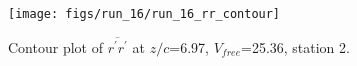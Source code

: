 \begin{figure}[H]
\centering
\texttt{[image: figs/run\_16/run\_16\_rr\_contour]}
\caption{Contour plot of $\overline{r^\prime r^\prime}$ at $z/c$=6.97, $V_{free}$=25.36, station 2.}
\label{fig:run_16_rr_contour}
\end{figure}


